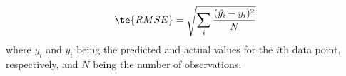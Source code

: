 $$\te{RMSE}=\sqrt{\sum\limits_{i}\frac{(\hat{y_i}-y_i)^2}{N}}$$
where $\hat{y_i}$ and $y_i$ being the predicted and actual values for the $i$th data point, respectively, and $N$ being the number of observations.